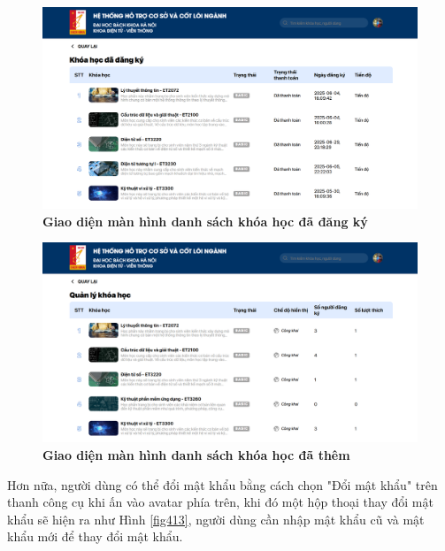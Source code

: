 \documentclass{article}
\begin{document}
	 \begin{figure}[!ht]
	 	\centering
	 	\includegraphics[trim= 10pt 10pt 10pt 10pt, clip, width=14cm]{localhost_3000_subscribed-course.png}
	 	\caption [Giao diện màn hình danh sách khóa học đã đăng ký]{\bfseries \fontsize{12pt}{0pt}\selectfont Giao diện màn hình danh sách khóa học đã đăng ký}
	 	\label{fig411}
	 \end{figure}
	 
	 \begin{figure}[!ht]
	 	\centering
	 	\includegraphics[trim= 10pt 10pt 10pt 10pt, clip, width=14cm]{localhost_3000_manage-course.png}
	 	\caption [Giao diện màn hình danh sách khóa học đã thêm]{\bfseries \fontsize{12pt}{0pt}\selectfont Giao diện màn hình danh sách khóa học đã thêm}
	 	\label{fig412}
	 \end{figure}
	 
	 Hơn nữa, người dùng có thể đổi mật khẩu bằng cách chọn "Đổi mật khẩu" trên thanh công cụ khi ấn vào avatar phía trên, khi đó một hộp thoại thay đổi mật khẩu sẽ hiện ra như Hình \ref{fig413}, người dùng cần nhập mật khẩu cũ và mật khẩu mới để thay đổi mật khẩu. 
	 
\end{document}
